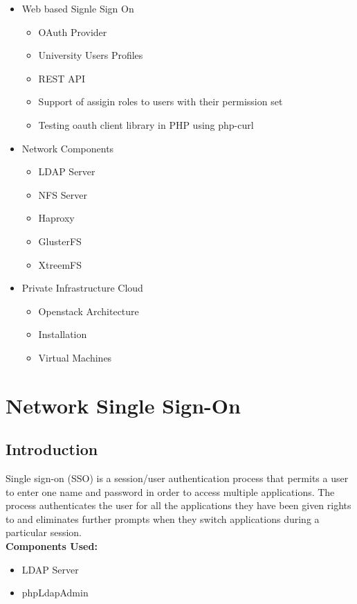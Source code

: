 \documentclass[12pt]{report}
\begin{document}
	\begin{itemize}
		\item Web based Signle Sign On
		\begin{itemize}
			\item OAuth Provider 
			\item University Users Profiles 
			\item REST API 
			\item Support of assigin roles to users with their permission set
			\item Testing oauth client library in PHP using php-curl
		\end{itemize}
		\item Network Components
		\begin{itemize}
			\item LDAP Server
			\item NFS Server
			\item Haproxy
			\item GlusterFS
			\item XtreemFS
		\end{itemize}
		\item Private Infrastructure Cloud
		\begin{itemize}
			\item Openstack Architecture
			\item Installation
			\item Virtual Machines
		\end{itemize}		 			

	\end{itemize}
\chapter{Network Single Sign-On}
\section{Introduction}
	
	Single sign-on (SSO) is a session/user authentication process that permits a user to enter one name and password in order to access multiple applications. The process authenticates the user for all the applications they have been given rights to and eliminates further prompts when they switch applications during a particular session.\\
	\underline{} \newline
	\textbf{Components Used:} 
	\begin{itemize}
	\item LDAP Server
	\item phpLdapAdmin
	\end{itemize}
\end{document}
